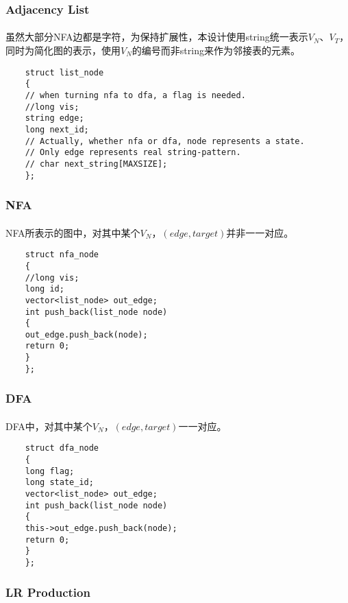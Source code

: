 \documentclass[UTF8]{ctexart}
\begin{document}
	\subsubsection{Adjacency List} %
	\label{ssub:adjacency_list}
	\paragraph{} %
	虽然大部分NFA边都是字符，为保持扩展性，本设计使用string统一表示$V_N$、$V_T$，
	同时为简化图的表示，使用$V_N$的编号而非string来作为邻接表的元素。
	\begin{lstlisting}
	struct list_node
	{
	// when turning nfa to dfa, a flag is needed.
	//long vis;
	string edge;
	long next_id;
	// Actually, whether nfa or dfa, node represents a state.
	// Only edge represents real string-pattern.
	// char next_string[MAXSIZE];
	};
	\end{lstlisting}
	\subsubsection{NFA} %
	\label{ssub:nfa}
	\paragraph{} %
	NFA所表示的图中，对其中某个$V_N$，$(edge, target)$并非一一对应。
	\begin{lstlisting}
	struct nfa_node
	{
	//long vis;
	long id;
	vector<list_node> out_edge;
	int push_back(list_node node)
	{
	out_edge.push_back(node);
	return 0;
	}
	};
	\end{lstlisting}
	\subsubsection{DFA} %
	\label{ssub:dfa}
	\paragraph{} %
	DFA中，对其中某个$V_N$，$(edge, target)$一一对应。
	\begin{lstlisting}
	struct dfa_node
	{
	long flag;
	long state_id;
	vector<list_node> out_edge;
	int push_back(list_node node)
	{
	this->out_edge.push_back(node);
	return 0;
	}
	};
	\end{lstlisting}
	\subsubsection{LR Production} %
	\label{ssub:lr_production}
\end{document}
